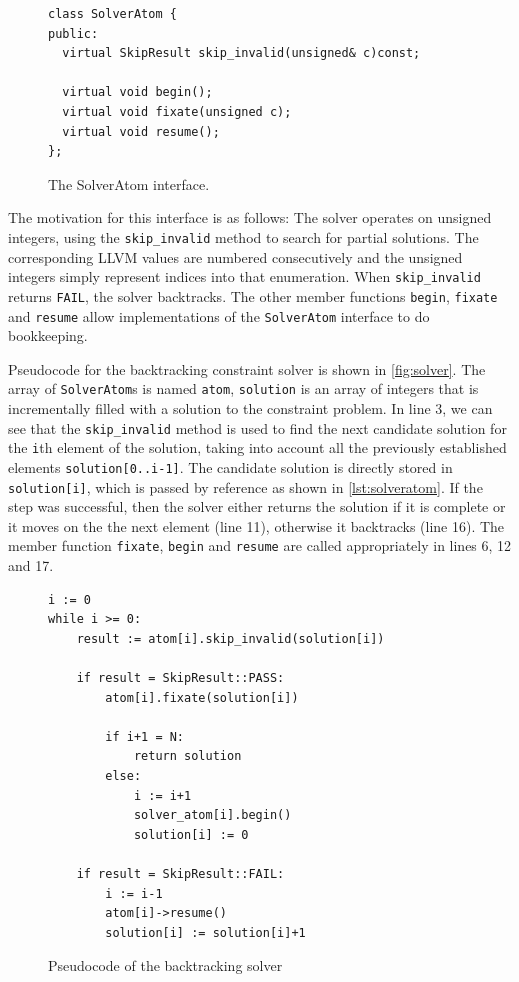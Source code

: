 \begin{figure}[ht]
\begin{lstlisting}
class SolverAtom {
public:
  virtual SkipResult skip_invalid(unsigned& c)const;

  virtual void begin();
  virtual void fixate(unsigned c);
  virtual void resume();
};
\end{lstlisting}
\vspace{-0.3cm}
\caption{The SolverAtom interface.}
\label{lst:solveratom}
\end{figure}

    The motivation for this interface is as follows:
    The solver operates on unsigned integers, using the \texttt{skip\_invalid}
    method to search for partial solutions.
    The corresponding LLVM values are numbered consecutively and the unsigned
    integers simply represent indices into that enumeration.
    When \texttt{skip\_invalid} returns \texttt{FAIL}, the solver backtracks.
    The other member functions \texttt{begin}, \texttt{fixate} and
    \texttt{resume} allow implementations of the \texttt{SolverAtom} interface
    to do bookkeeping.

    Pseudocode for the backtracking constraint solver is shown in
    \autoref{fig:solver}.
    The array of \texttt{SolverAtom}s is named \texttt{atom}, \texttt{solution}
    is an array of integers that is incrementally filled with a solution to the
    constraint problem.
    In line 3, we can see that the \texttt{skip\_invalid} method is used to find
    the next candidate solution for the \texttt{i}th element of the solution,
    taking into account all the previously established elements
    \texttt{solution[0..i-1]}.
    The candidate solution is directly stored in \texttt{solution[i]}, which is
    passed by reference as shown in \autoref{lst:solveratom}.
    If the step was successful, then the solver either returns the solution if
    it is complete or it moves on the the next element (line 11), otherwise it
    backtracks (line 16).
    The member function \texttt{fixate}, \texttt{begin} and \texttt{resume} are
    called appropriately in lines 6, 12 and 17.

\begin{figure}[t]
\begin{lstlisting}
i := 0
while i >= 0:
    result := atom[i].skip_invalid(solution[i])

    if result = SkipResult::PASS:
        atom[i].fixate(solution[i])

        if i+1 = N:
            return solution
        else:
            i := i+1
            solver_atom[i].begin()
            solution[i] := 0

    if result = SkipResult::FAIL:
        i := i-1
        atom[i]->resume()
        solution[i] := solution[i]+1
\end{lstlisting}
\vspace{-0.3cm}
\caption{Pseudocode of the backtracking solver}
\label{fig:solver}
\end{figure}

